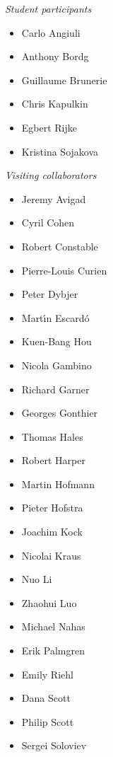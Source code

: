 
\centerline{\emph{Student participants}}
%
\begin{multicols}{3}{
\begin{itemize}
\item[] Carlo Angiuli
\item[] Anthony Bordg
\item[] Guillaume Brunerie
\item[] Chris Kapulkin
\item[] Egbert Rijke
\item[] Kristina Sojakova
\end{itemize}
}
\end{multicols}


\centerline{\emph{Visiting collaborators}}
%
\begin{multicols}{3}{
\begin{itemize}
\item[] Jeremy Avigad
\item[] Cyril Cohen
\item[] Robert Constable
\item[] Pierre-Louis Curien
\item[] Peter Dybjer
\item[] Mart{\'\i}n Escard{\'o}
\item[] Kuen-Bang Hou
\item[] Nicola Gambino
\item[] Richard Garner
\item[] Georges Gonthier
\item[] Thomas Hales
\item[] Robert Harper
\item[] Martin Hofmann
\item[] Pieter Hofstra
\item[] Joachim Kock
\item[] Nicolai Kraus
\item[] Nuo Li
\item[] Zhaohui Luo
\item[] Michael Nahas
\item[] Erik Palmgren
\item[] Emily Riehl
\item[] Dana Scott
\item[] Philip Scott
\item[] Sergei Soloviev
\end{itemize}
}
\end{multicols}

